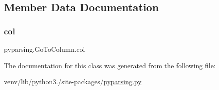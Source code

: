 \subsection{Member Data Documentation}
\mbox{\label{classpyparsing_1_1GoToColumn_ae61e2557b0c5b07b4ba69928494bfd7c}} 
\subsubsection{\texorpdfstring{col}{col}}
{\footnotesize\ttfamily pyparsing.\+Go\+To\+Column.\+col}



The documentation for this class was generated from the following file\+:\begin{DoxyCompactItemize}
\item 
venv/lib/python3./site-\/packages/\hyperlink{pyparsing_8py}{pyparsing.\+py}\end{DoxyCompactItemize}
